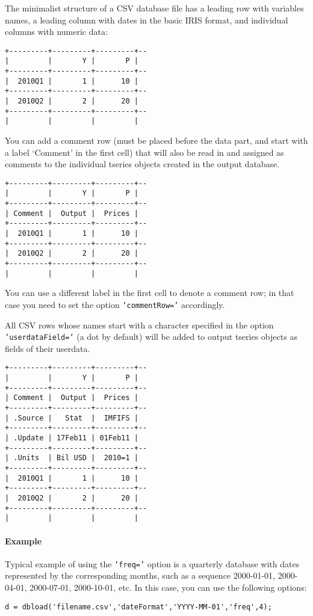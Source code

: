 The minimalist structure of a CSV database file has a leading row with
variables names, a leading column with dates in the basic IRIS format,
and individual columns with numeric data:

\begin{verbatim}
+---------+---------+---------+--
|         |       Y |       P |
+---------+---------+---------+--
|  2010Q1 |       1 |      10 |
+---------+---------+---------+--
|  2010Q2 |       2 |      20 |
+---------+---------+---------+--
|         |         |         |
\end{verbatim}

You can add a comment row (must be placed before the data part, and
start with a label `Comment' in the first cell) that will also be read
in and assigned as comments to the individual tseries objects created in
the output database.

\begin{verbatim}
+---------+---------+---------+--
|         |       Y |       P |
+---------+---------+---------+--
| Comment |  Output |  Prices |
+---------+---------+---------+--
|  2010Q1 |       1 |      10 |
+---------+---------+---------+--
|  2010Q2 |       2 |      20 |
+---------+---------+---------+--
|         |         |         |
\end{verbatim}

You can use a different label in the first cell to denote a comment row;
in that case you need to set the option \texttt{'commentRow='}
accordingly.

All CSV rows whose names start with a character specified in the option
\texttt{'userdataField='} (a dot by default) will be added to output
tseries objects as fields of their userdata.

\begin{verbatim}
+---------+---------+---------+--
|         |       Y |       P |
+---------+---------+---------+--
| Comment |  Output |  Prices |
+---------+---------+---------+--
| .Source |   Stat  |  IMFIFS |
+---------+---------+---------+--
| .Update | 17Feb11 | 01Feb11 |
+---------+---------+---------+--
| .Units  | Bil USD |  2010=1 |
+---------+---------+---------+--
|  2010Q1 |       1 |      10 |
+---------+---------+---------+--
|  2010Q2 |       2 |      20 |
+---------+---------+---------+--
|         |         |         |
\end{verbatim}

\paragraph{Example}\label{example}

Typical example of using the \texttt{'freq='} option is a quarterly
database with dates represented by the corresponding months, such as a
sequence 2000-01-01, 2000-04-01, 2000-07-01, 2000-10-01, etc. In this
case, you can use the following options:

\begin{verbatim}
d = dbload('filename.csv','dateFormat','YYYY-MM-01','freq',4);
\end{verbatim}


